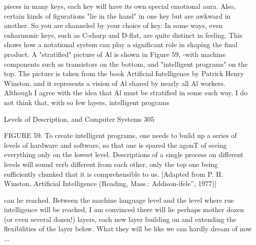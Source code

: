        pieces in many keys, each key will have its own special emotional aura. Also,
       certain kinds of figurations "lie in the hand" in one key but are awkward in
       another. So you are channeled by your choice of key. In some ways, even
       enharmonic keys, such as C-sharp and D-flat, are quite distinct in feeling. This
       shows how a notational system can play a significant role in shaping the final
       product.
                A "stratified" picture of Al is shown in Figure 59, -with machine
       components such as transistors on the bottom, and "intelligent programs" on the
       top. The picture is taken from the book Artificial Intelligence by Patrick Henry
       Winston, and it represents a vision of Al shared by nearly all Al workers.
       Although I agree with the idea that Al must be stratified in some such way, I do
       not think that, with so few layers, intelligent programs



Levels of Description, and Computer Systems                                              305

                                                FIGURE 59. To create intelligent
                                                programs, one needs to build up a series
                                                of levels of hardware and software, so
                                                that one is spared the agonT of seeing
                                                everything only on the lowest level.
                                                Descriptions of a single process on
                                                different levels will sound verb different
                                                from each other, only the top one being
                                                sufficiently    chunked    that    it    is
                                                comprehensible to us. [Adapted from P.
                                                H. Winston, Artificial Intelligence
                                                (Reading, Mass.: Addison-ifele'', 1977)]


       can he reached. Between the machine language level and the level where rue
       intelligence will be reached, I am convinced there will lie perhaps mother dozen
       (or even several dozen!) layers, each new layer building on and extending the
       flexibilities of the layer below. What they will be like we can hardly dream of
       now ...


